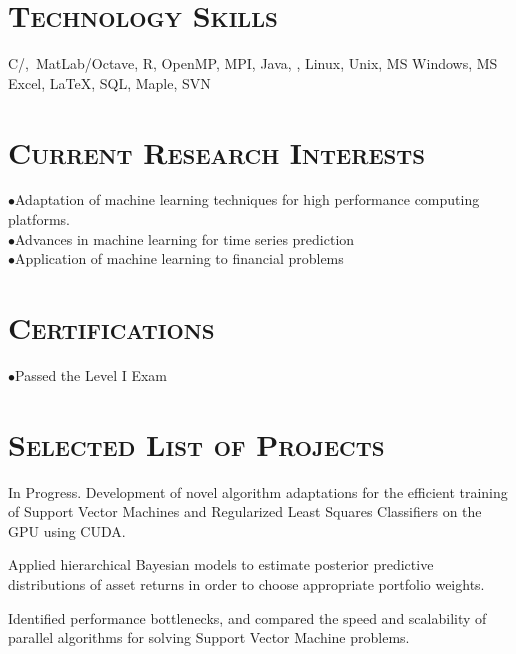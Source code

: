 \begin{resume}
\section{\textsc{Technology Skills}}
C/\Cplusplus,\ MatLab/Octave, R, OpenMP, MPI, Java, \CSharp, Linux, Unix, MS Windows, MS Excel, \LaTeX, SQL, Maple, SVN

\section{\textsc{Current Research Interests}}
$\bullet$Adaptation of machine learning techniques for high performance computing platforms. \\
$\bullet$Advances in machine learning for time series prediction \\
$\bullet$Application of machine learning to financial problems

\section{\textsc{Certifications}}
                 
\dates{}
\begin{position}
$\bullet$Passed the Level I Exam \\

\end{position}


\section{\textsc{Selected List of Projects}}
\begin{position}
In Progress. Development of novel algorithm adaptations for the efficient training of Support Vector Machines and Regularized Least Squares Classifiers on the GPU using CUDA.
\end{position}

\begin{position}
Applied hierarchical Bayesian models to estimate posterior predictive distributions of asset returns in order to choose appropriate portfolio weights.
\end{position}

\begin{position}
Identified performance bottlenecks, and compared the speed and scalability of parallel algorithms for solving Support Vector Machine problems.
\end{position}	


\end{resume}
